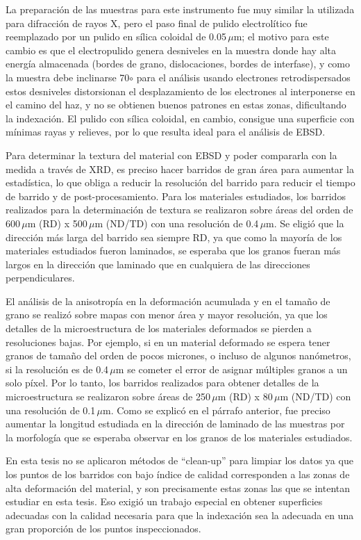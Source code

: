 La preparación de las muestras para este instrumento fue muy similar la utilizada para difracción de rayos X, pero el paso final de pulido electrolítico fue reemplazado por un pulido en sílica coloidal de 0.05\,$\mu$m; el motivo para este cambio es que el electropulido genera desniveles en la muestra donde hay alta energía almacenada (bordes de grano, dislocaciones, bordes de interfase), y como la muestra debe inclinarse 70$\circ$ para el análisis usando electrones retrodispersados estos desniveles distorsionan el desplazamiento de los electrones al interponerse en el camino del haz, y no se obtienen buenos patrones en estas zonas, dificultando la indexación.
El pulido con sílica coloidal, en cambio, consigue una superficie con mínimas rayas y relieves, por lo que resulta ideal para el análisis de EBSD.

Para determinar la textura del material con EBSD y poder compararla con la medida a través de XRD, es preciso hacer barridos de gran área para aumentar la estadística, lo que obliga a reducir la resolución del barrido para reducir el tiempo de barrido y de post-procesamiento.
Para los materiales estudiados, los barridos realizados para la determinación de textura se realizaron sobre áreas del orden de 600\,$\mu$m (RD) x 500\,$\mu$m (ND/TD) con una resolución de 0.4\,$\mu$m.
Se eligió que la dirección más larga del barrido sea siempre RD, ya que como la mayoría de los materiales estudiados fueron laminados, se esperaba que los granos fueran más largos en la dirección que laminado que en cualquiera de las direcciones perpendiculares.

El análisis de la anisotropía en la deformación acumulada y en el tamaño de grano se realizó sobre mapas con menor área y mayor resolución, ya que los detalles de la microestructura de los materiales deformados se pierden a resoluciones bajas.
Por ejemplo, si en un material deformado se espera tener granos de tamaño del orden de pocos micrones, o incluso de algunos nanómetros, si la resolución es de 0.4\,$\mu$m se cometer el error de asignar múltiples granos a un solo píxel.
Por lo tanto, los barridos realizados para obtener detalles de la microestructura se realizaron sobre áreas de 250\,$\mu$m (RD) x 80\,$\mu$m (ND/TD) con una resolución de 0.1\,$\mu$m.
Como se explicó en el párrafo anterior, fue preciso aumentar la longitud estudiada en la dirección de laminado de las muestras por la morfología que se esperaba observar en los granos de los materiales estudiados.

En esta tesis no se aplicaron métodos de “clean-up” para limpiar los datos ya que los puntos de los barridos con bajo índice de calidad corresponden a las zonas de alta deformación del material, y son precisamente estas zonas las que se intentan estudiar en esta tesis. 
Eso exigió un trabajo especial en obtener superficies adecuadas con la calidad necesaria para que la indexación sea la adecuada en una gran proporción de los puntos inspeccionados.

